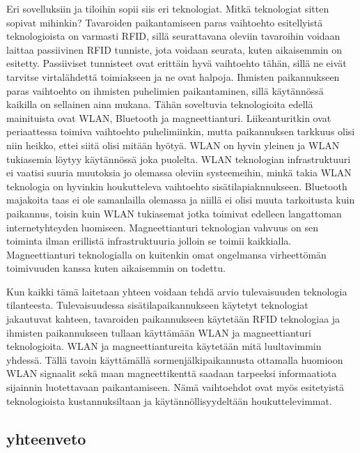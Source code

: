 Eri sovelluksiin ja tiloihin sopii siis eri teknologiat. Mitkä teknologiat sitten sopivat mihinkin? Tavaroiden paikantamiseen paras vaihtoehto esitellyistä teknologioista on varmasti RFID, sillä seurattavana oleviin tavaroihin voidaan laittaa passiivinen RFID tunniste, jota voidaan seurata, kuten aikaisemmin on esitetty. Passiiviset tunnisteet ovat erittäin hyvä vaihtoehto tähän, sillä ne eivät tarvitse virtalähdettä toimiakseen ja ne ovat halpoja\cite{F}.  Ihmisten paikannukseen paras vaihtoehto on ihmisten puhelimien paikantaminen, sillä käytännössä kaikilla on sellainen aina mukana. Tähän soveltuvia teknologioita edellä mainituista ovat WLAN, Bluetooth ja magneettianturi. Liikeanturitkin ovat periaattessa toimiva vaihtoehto puhelimiinkin, mutta paikannuksen tarkkuus olisi niin heikko, ettei siitä olisi mitään hyötyä. WLAN on hyvin yleinen ja WLAN tukiasemia löytyy käytännössä joka puolelta. WLAN teknologian infrastruktuuri ei vaatisi suuria muutoksia jo olemassa oleviin systeemeihin, minkä takia WLAN teknologia on hyvinkin houkutteleva vaihtoehto sisätilapiaknnukseen. Bluetooth majakoita taas ei ole samanlailla olemassa ja niillä ei olisi muuta tarkoitusta kuin paikannus, toisin kuin WLAN tukiasemat jotka toimivat edelleen langattoman internetyhteyden luomiseen. Magneettianturi teknologian vahvuus on sen toiminta ilman erillistä infrastruktuuria jolloin se toimii kaikkialla. Magneettianturi teknologialla on kuitenkin omat ongelmansa virheettömän toimivuuden kanssa kuten aikaisemmin on todettu. 

Kun kaikki tämä laitetaan yhteen voidaan tehdä arvio tulevaisuuden teknologia tilanteesta. Tulevaisuudessa sisätilapaikannukseen käytetyt teknologiat jakautuvat kahteen, tavaroiden paikannukseen käytetään RFID teknologiaa ja ihmisten paikannukseen tullaan käyttämään WLAN ja magneettianturi teknologioita. WLAN ja magneettiantureita käytetään mitä luultavimmin yhdessä\cite{atlas}. Tällä tavoin käyttämällä sormenjälkipaikannusta ottamalla huomioon WLAN signaalit sekä maan magneettikenttä saadaan tarpeeksi informaatiota sijainnin luotettavaan paikantamiseen. Nämä vaihtoehdot ovat myös esitetyistä teknologioista kustannuksiltaan ja käytännöllisyydeltään houkuttelevimmat.
\subsection{yhteenveto}

